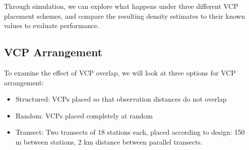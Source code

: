 \documentclass[12pt]{article}
\begin{document}
Through simulation, we can explore what happens under three different VCP placement schemes, and compare the resulting density estimates to their known values to evaluate performance.

\subsection{VCP Arrangement}
\label{sec:layout}
To examine the effect of VCP overlap, we will look at three options for VCP arrangement:
\begin{itemize}
	\item Structured: VCPs placed so that observation distances do not overlap
	\item Random: VCPs placed completely at random
	\item Transect: Two transects of 18 stations each, placed according to \textcite{micronesian} design: 150 m between stations, 2 km distance between parallel transects.
\end{itemize}
\end{document}
